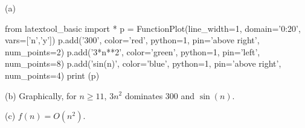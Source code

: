 
(a)
\begin{python}
from latextool_basic import *
p = FunctionPlot(line_width=1, domain='0:20', vars=['n','y'])
p.add('300', color='red', python=1, pin='above right', num_points=2)
p.add('3*n**2', color='green', python=1, pin='left', num_points=8)
p.add('sin(n)', color='blue', python=1, pin='above right', num_points=4)
print (p)
\end{python}

(b)
Graphically, for $n \geq 11$,
$3n^2$ dominates $300$ and $\sin(n)$.

(c)
$f(n) = O(n^2)$.
